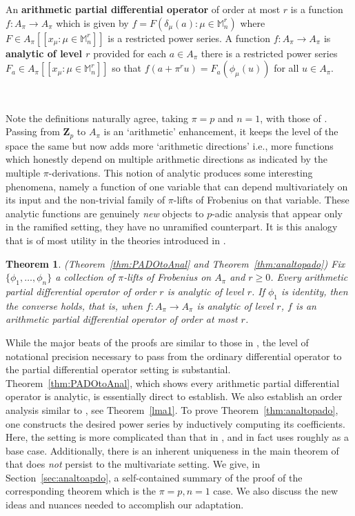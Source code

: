 \documentclass[10pt]{amsart}
\theoremstyle{Theorem}
\newtheorem{thm}{Theorem}[section]
\theoremstyle{definition}
\newcommand{\ZZ}{\mathbf Z}
\renewcommand{\d}{\delta}
\begin{document}
An {\bf arithmetic partial differential operator} of order at most $r$ is a function $f \colon A_\pi \to A_\pi$ which is given by $f = F(\d_\mu (a) \colon \mu \in \mathbb M_n^r)$ where $F \in A_\pi[[x_\mu \colon \mu \in \mathbb M_n^r]]$ is a restricted power series. A function $f \colon A_\pi \to A_\pi$ is {\bf analytic of level $r$} provided for each $a \in A_\pi$ there is a restricted power series $F_a \in A_\pi[[x_\mu \colon \mu \in \mathbb M_n^r]]$ so that $f(a + \pi^r u) = F_a(\phi_\mu(u))$ for all $u \in A_\pi$. 

\

Note the definitions naturally agree, taking $\pi = p$ and $n = 1$, with those of \cite{BRS11}. Passing from $\ZZ_p$ to $A_\pi$ is an `arithmetic' enhancement, it keeps the level of the space the same but now adds more `arithmetic directions' i.e., more functions which honestly depend on multiple arithmetic directions as indicated by the multiple $\pi$-derivations. This notion of analytic produces some interesting phenomena, namely a function of one variable that can depend multivariately on its input and the non-trivial family of $\pi$-lifts of Frobenius on that variable. These analytic functions are genuinely {\it new} objects to $p$-adic analysis that appear only in the ramified setting, they have no unramified counterpart. It is this analogy that is of most utility in the theories introduced in \cite{BM23b,BM26}. 

\begin{thm}(Theorem~\ref{thm:PADOtoAnal} and Theorem~\ref{thm:analtopado}) Fix $\{ \phi_1,\ldots,\phi_n\}$ a collection of $\pi$-lifts of Frobenius on $A_\pi$ and $r \geq 0$. Every arithmetic partial differential operator of order $r$ is analytic of level $r$.  If $\phi_1$ is identity,
then the converse holds, that is, when $f \colon A_\pi \to A_\pi$ is analytic of level $r$, $f$ is an arithmetic partial differential operator of order at most $r$.
\end{thm}

While the major beats of the proofs are similar to those in \cite{BRS11}, the level of notational precision necessary to pass from the ordinary differential operator to the partial differential operator setting is substantial. Theorem~\ref{thm:PADOtoAnal}, which shows every arithmetic partial differential operator is analytic, is essentially direct to establish. We also establish an order analysis similar to \cite[Lem. 10]{BRS11}, see Theorem~\ref{lma1}. To prove Theorem~\ref{thm:analtopado}, one constructs the desired power series by inductively computing its coefficients. Here, the setting is more complicated than that in \cite{BRS11}, and in fact uses \cite[Thm. 1]{BRS11} roughly as a base case. Additionally, there is an inherent uniqueness in the main theorem of \cite{BRS11} that does {\it not} persist to the multivariate setting. We give, in Section~\ref{sec:analtoapdo}, a self-contained summary of the proof of the corresponding theorem \cite[Thm. 5]{BRS11} which is the $\pi = p, n = 1$ case. We also discuss the new ideas and nuances needed to accomplish our adaptation. 
\end{document}
